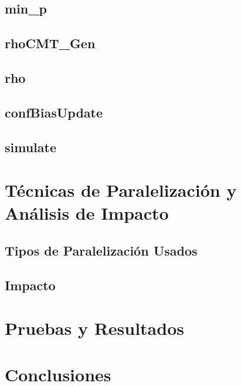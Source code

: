 \documentclass{article}
\begin{document}
\subsection{min_p}

\subsection{rhoCMT_Gen}

\subsection{rho}

\subsection{confBiasUpdate}

\subsection{simulate}

\section{Técnicas de Paralelización y Análisis de Impacto}

\subsection{Tipos de Paralelización Usados}

\subsection{Impacto}

\section{Pruebas y Resultados}

\section{Conclusiones}
\end{document}
